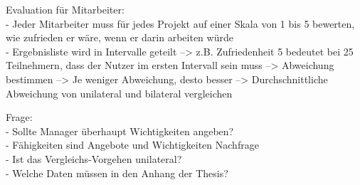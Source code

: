 Evaluation für Mitarbeiter:\\
- Jeder Mitarbeiter muss für jedes Projekt auf einer Skala von 1 bis 5 bewerten, wie zufrieden er wäre, wenn er darin arbeiten würde\\
- Ergebnisliste wird in Intervalle geteilt --> z.B. Zufriedenheit 5 bedeutet bei 25 Teilnehmern, dass der Nutzer im ersten Intervall sein muss --> Abweichung bestimmen --> Je weniger Abweichung, desto besser --> Durchschnittliche Abweichung von unilateral und bilateral vergleichen

Frage:\\
- Sollte Manager überhaupt Wichtigkeiten angeben?\\
	- Fähigkeiten sind Angebote und Wichtigkeiten Nachfrage\\
- Ist das Vergleichs-Vorgehen unilateral?\\
- Welche Daten müssen in den Anhang der Thesis?

